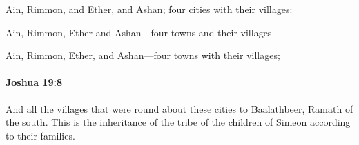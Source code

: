 			\begin{versebox}
					\item[BHS] 
					\item[ASV] Ain, Rimmon, and Ether, and Ashan; four cities with their villages:
					\item[NIV] Ain, Rimmon, Ether and Ashan—four towns and their villages—
					\item[NRSV] Ain, Rimmon, Ether, and Ashan—four towns with their villages;
			\end{versebox}

		\paragraph{Joshua 19:8} %
			\label{JOSHUA-19-8}

			And all the villages that were round about these cities to Baalathbeer, Ramath of the south. This is the inheritance of the tribe of the children of Simeon according to their families.

